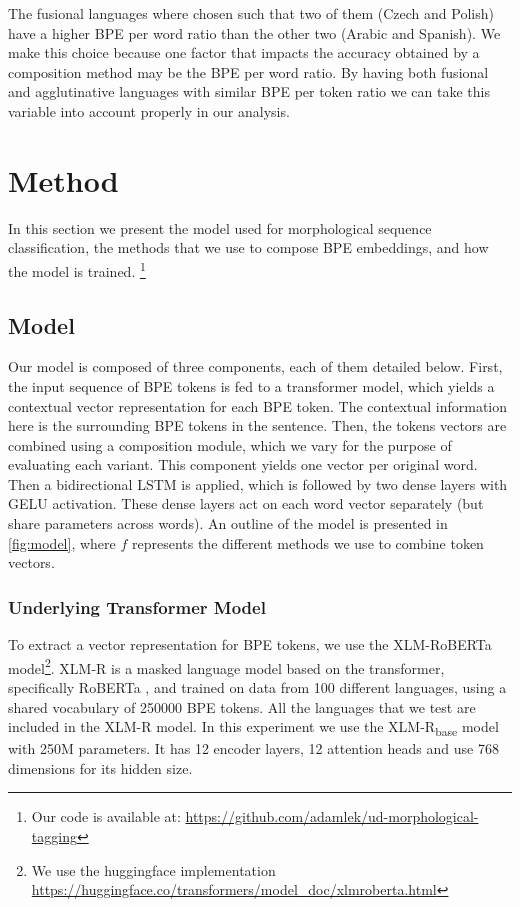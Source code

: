 \documentclass[11pt]{article}
\newcommand\citep{\cite}
\begin{document}
        The fusional languages where chosen such that two of them
        (Czech and Polish) have a higher BPE per word ratio than the
        other two (Arabic and Spanish). We make this choice because
        one factor that impacts the accuracy obtained by a composition
        method may be the BPE per word ratio.  By having both
        fusional and agglutinative languages with similar BPE per
        token ratio we can take this variable into account properly in
        our analysis.
        
	\section{Method}
	\label{method}
    	In this section we present the model used for morphological sequence
     classification, the methods that we use to compose BPE
     embeddings, and how the model is trained. \footnote{Our code is
     available at: \url{https://github.com/adamlek/ud-morphological-tagging}}

	\subsection{Model}

            Our model is composed of three components, each of them
     detailed below. First, the input sequence of BPE tokens is fed to
     a transformer model, which yields a contextual vector
     representation for each BPE token. The contextual information
     here is the surrounding BPE tokens in the sentence.  Then, the
     tokens vectors are combined using a composition module, which we
     vary for the purpose of evaluating each variant. This component
     yields one vector per original word. Then a bidirectional LSTM is
     applied, which is followed by two dense layers with GELU
     \citep{hendrycks2016gaussian} activation. These dense layers act
     on each word vector separately (but share parameters across
     words).  An outline of the model is presented in
     \cref{fig:model}, where $f$ represents the different methods we
     use to combine token vectors.

	\subsubsection{Underlying Transformer Model}
         To extract a vector representation for BPE tokens, we use the
     XLM-RoBERTa \cite{conneau2019unsupervised} model\footnote{We use
     the huggingface implementation
     \url{https://huggingface.co/transformers/model_doc/xlmroberta.html}}. XLM-R
     is a masked language model based on the transformer, specifically
     RoBERTa \citep{liu2019roberta}, and trained on data from 100
     different languages, using a shared vocabulary of 250000 BPE
     tokens. All the languages that we test are included in the XLM-R
     model. In this experiment we use the XLM-R\textsubscript{base} model
     with 250M parameters. It has 12 encoder layers, 12 attention
     heads and use 768 dimensions for its hidden size.
\end{document}
